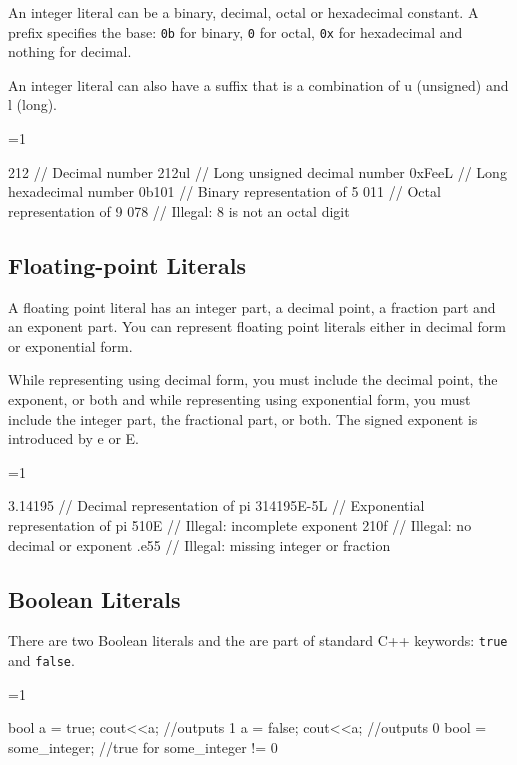 \documentclass[10pt,a4paper]{scrartcl}
\gdef\conditionmacro{1}
\begin{document}
\begin{multicols*}{2}
An integer literal can be a binary, decimal, octal or hexadecimal constant. A prefix specifies the base: \verb+0b+ for binary, \verb+0+ for octal, \verb+0x+ for hexadecimal and nothing for decimal.

An integer literal can also have a suffix that is a combination of u (unsigned) and l (long).

\ifnum\conditionmacro=1
\begin{TPCpp}
212     // Decimal number
212ul   // Long unsigned decimal number
0xFeeL  // Long hexadecimal number
0b101   // Binary representation of 5
011     // Octal representation of 9
078     // Illegal: 8 is not an octal digit
\end{TPCpp}
\fi

\subsection{Floating-point Literals}

A floating point literal has an integer part, a decimal point, a fraction part and an exponent part. You can represent floating point literals either in decimal form or exponential form.

While representing using decimal form, you must include the decimal point, the exponent, or both and while representing using exponential form, you must include the integer part, the fractional part, or both. The signed exponent is introduced by e or E.

\ifnum\conditionmacro=1
\begin{TPCpp}
3.14195      // Decimal representation of pi
314195E-5L   // Exponential representation of pi
510E         // Illegal: incomplete exponent
210f         // Illegal: no decimal or exponent
.e55         // Illegal: missing integer or fraction
\end{TPCpp}
\fi

\subsection{Boolean Literals}

There are two Boolean literals and the are part of standard C++ keywords: \verb+true+ and \verb+false+.

\ifnum\conditionmacro=1
\begin{TPCpp}
bool a = true;
cout<<a; //outputs 1
a = false;
cout<<a; //outputs 0
bool = some_integer; //true for some_integer != 0
\end{TPCpp}
\fi


\end{multicols*}
\end{document}
